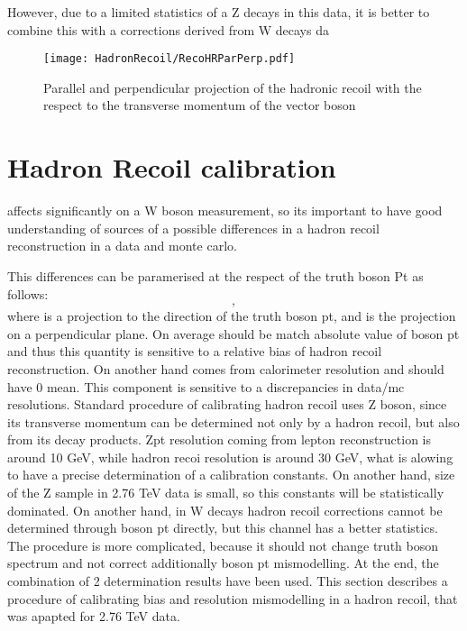 However, due to a limited statistics of a Z decays in this data, it is better to combine this with a corrections derived from W decays da

\begin{figure}[t]
\begin{center}
\texttt{[image: HadronRecoil/RecoHRParPerp.pdf]}
\caption{Parallel and perpendicular projection of the hadronic recoil with the respect to the transverse momentum of the vector boson \label{ris:HadrRecoilTruthPt}}
\end{center}
\end{figure}

\section{Hadron Recoil calibration}
\etmiss affects significantly on a W boson measurement, so its important to have good understanding of sources of a possible differences in a hadron recoil reconstruction in a data and monte carlo. 

This differences can be paramerised at the respect of the truth boson Pt as follows:
\begin{equation}
,
\end{equation}
where \upar is a projection to the direction of the truth boson pt, and \uperp is the projection on a perpendicular plane. On average \upar should be match absolute value of boson pt and thus this quantity is sensitive to a relative bias of hadron recoil reconstruction. On another hand \uperp comes from calorimeter resolution and should have 0 mean. This component is sensitive to a discrepancies in data/mc resolutions. 
Standard procedure of calibrating hadron recoil uses Z boson, since its transverse momentum can be determined not only by a hadron recoil, but also from its decay products.  Zpt resolution coming from lepton reconstruction is around 10 GeV, while hadron recoi resolution is around 30 GeV, what is alowing to have a precise determination of a calibration constants. On another hand, size of the Z sample in 2.76 TeV data is small, so this constants will be statistically dominated.
On another hand, in W decays hadron recoil corrections cannot be determined through boson pt directly, but this channel has a better statistics.  The  procedure is more complicated, because it should not change truth boson spectrum and not correct additionally boson pt mismodelling.
At the end, the combination of 2 determination results have been used. This section describes a procedure of calibrating bias and resolution mismodelling in a hadron recoil, that was apapted for 2.76 TeV data. 

